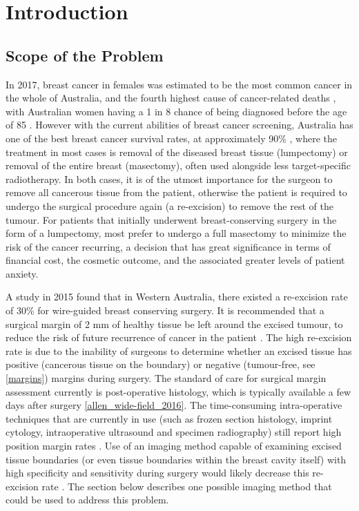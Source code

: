 \chapter{Introduction}
\acresetall

\section{Scope of the Problem}\label{problem}
In 2017, breast cancer in females was estimated to be the most common cancer in the whole of Australia, and the fourth highest cause of cancer-related deaths \cite{australian_institute_of_health_and_welfare_cancer_2017}, with Australian women having a 1 in 8 chance of being diagnosed before the age of 85 \cite{australian_institute_of_health_and_welfare_breast_2012}. However with the current abilities of breast cancer screening, Australia has one of the best breast cancer survival rates, at approximately 90\% \cite{australian_institute_of_health_and_welfare_breast_2012}, where the treatment in most cases is removal of the diseased breast tissue (lumpectomy) or removal of the entire breast (masectomy), often used alongside less target-specific radiotherapy. In both cases, it is of the utmost importance for the surgeon to remove all cancerous tissue from the patient, otherwise the patient is required to undergo the surgical procedure again (a re-excision) to remove the rest of the tumour. For patients that initially underwent breast-conserving surgery in the form of a lumpectomy, most prefer to undergo a full masectomy to minimize the risk of the cancer recurring, a decision that has great significance in terms of financial cost, the cosmetic outcome, and the associated greater levels of patient anxiety. 

A study in 2015 \cite{ballal_predictors_2015} found that in Western Australia, there existed a re-excision rate of 30\% for wire-guided breast conserving surgery. It is recommended that a surgical margin of 2 mm of healthy tissue be left around the excised tumour, to reduce the risk of future recurrence of cancer in the patient \cite{behm_surgical_2013}. The high re-excision rate is due to the inability of surgeons to determine whether an excised tissue has positive (cancerous tissue on the boundary) or negative (tumour-free, see \autoref{margins}) margins during surgery. The standard of care for surgical margin assessment currently is post-operative histology, which is typically available a few days after surgery \ref{allen_wide-field_2016}. The time-consuming intra-operative techniques that are currently in use (such as frozen section histology, imprint cytology, intraoperative ultrasound and specimen radiography) still report high position margin rates \cite{cabioglu_role_2007}. Use of an imaging method capable of examining excised tissue boundaries (or even tissue boundaries within the breast cavity itself) with high specificity and sensitivity during surgery would likely decrease this re-excision rate \cite{ballal_predictors_2015}. The section below describes one possible imaging method that could be used to address this problem. 

